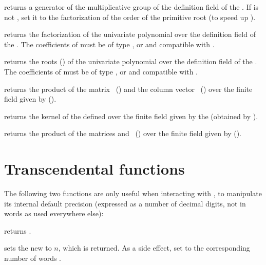  returns a generator of the
multiplicative group of the definition field of the  .
If  is not , set it to the factorization of the order
of the primitive root (to speed up ).

 returns the factorization of the univariate
polynomial  over the definition field of the  . The
coefficients of  must be of type ,  or 
and compatible with .

 returns the roots ()
of the univariate polynomial  over the definition field of the
 . The coefficients of  must be of type ,
 or  and compatible with .

 returns the product of
the matrix~ () and the column vector~
() over the finite field given by  ().

 returns the kernel of the  
defined over the finite field given by the   (obtained
by ).




 returns the product of the
matrices  and~ () over the finite field given
by  ().


\section{Transcendental functions}

The following two functions are only useful when interacting with ,
to manipulate its internal default precision (expressed as a number of
decimal digits, not in words as used everywhere else):

 returns .

 sets the new
 to $n$, which is returned. As a side effect, set
 to the corresponding number of words .

